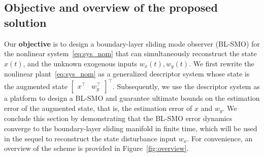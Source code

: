 \documentclass[times, doublespace]{rncauth}
\begin{document}
\subsection{Objective and overview of the proposed solution}
Our \textbf{objective} is to design a boundary-layer sliding mode observer (BL-SMO) for the nonlinear system~\eqref{eq:sys_nom} that can simultaneously reconstruct the state $x(t)$, and the unknown exogenous inputs $w_x(t), w_y(t)$. We first rewrite the nonlinear plant~\eqref{eq:sys_nom} as a generalized descriptor system whose state is the augmented state $\begin{bmatrix}
x^\top & w_y^\top
\end{bmatrix}^\top$. Subsequently, we use the descriptor system as a platform to design a BL-SMO and guarantee ultimate bounds on the estimation error of the augmented state, that is, the estimation error of $x$ and $w_y$. We conclude this section by demonstrating that the BL-SMO error dynamics converge to the boundary-layer sliding manifold in finite time, which will be used in the sequel to reconstruct the state disturbance input $w_x$.
For convenience, an overview of the scheme is provided in Figure~\ref{fig:overview}.
\end{document}
